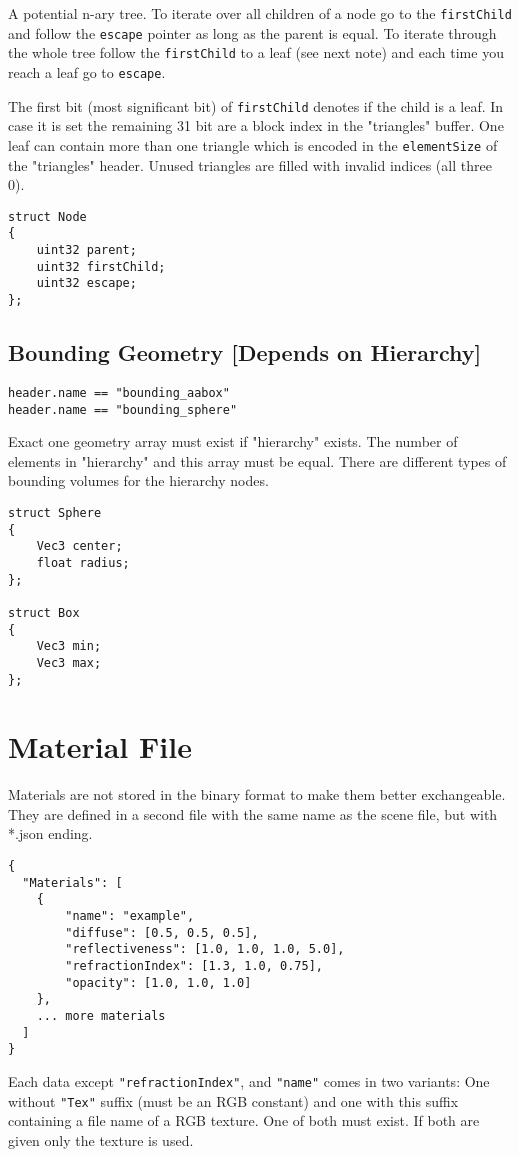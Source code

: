 \documentclass[english,10pt,a4paper,twocolumn,colorscheme=green]{orarticle}
\begin{document}
	A potential n-ary tree. To iterate over all children of a node go to the \lstinline|firstChild| and follow the \lstinline|escape| pointer as long as the parent is equal. To iterate through the whole tree follow the \lstinline|firstChild| to a leaf (see next note) and each time you reach a leaf go to \lstinline|escape|.
	
	The first bit (most significant bit) of \lstinline|firstChild| denotes if the child is a leaf. In case it is set the remaining 31 bit are a block index in the "triangles" buffer. One leaf can contain more than one triangle which is encoded in the \lstinline|elementSize| of the "triangles" header. Unused triangles are filled with invalid indices (all three 0).
	\begin{lstlisting}
struct Node
{
	uint32 parent;
	uint32 firstChild;
	uint32 escape;
};
	\end{lstlisting}
	
	\subsection{Bounding Geometry [Depends on Hierarchy]}
	\lstinline|header.name == "bounding_aabox"|\\
	\lstinline|header.name == "bounding_sphere"|
	
	Exact one geometry array must exist if "hierarchy" exists. The number of elements in "hierarchy" and this array must be equal. There are different types of bounding volumes for the hierarchy nodes.
	\begin{lstlisting}
struct Sphere
{
	Vec3 center;
	float radius;
};

struct Box
{
	Vec3 min;
	Vec3 max;
};
	\end{lstlisting}
	
	
		
	\section{Material File}
	Materials are not stored in the binary format to make them better exchangeable. They are defined in a second file with the same name as the scene file, but with *.json ending.
	\begin{lstlisting}
{
  "Materials": [
	{
		"name": "example",
		"diffuse": [0.5, 0.5, 0.5],
		"reflectiveness": [1.0, 1.0, 1.0, 5.0],
		"refractionIndex": [1.3, 1.0, 0.75],
		"opacity": [1.0, 1.0, 1.0]
	},		
	... more materials
  ]
}
	\end{lstlisting}
	Each data except \lstinline|"refractionIndex"|, and \lstinline|"name"| comes in two variants: One without \lstinline|"Tex"| suffix (must be an RGB constant) and one with this suffix containing a file name of a RGB texture. One of both must exist. If both are given only the texture is used.
	
\end{document}

